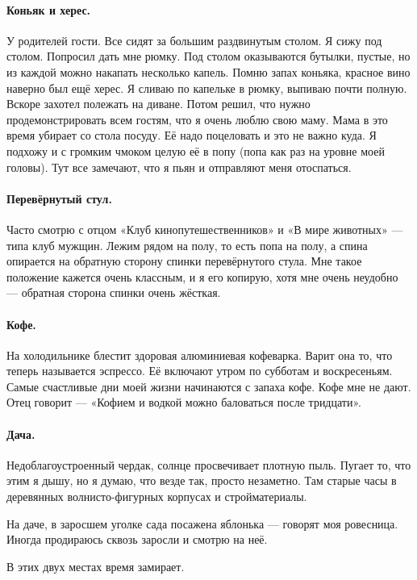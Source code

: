 \documentclass{book}
\begin{document}
\paragraph{Коньяк и херес.}
У родителей гости.
Все сидят за большим раздвинутым столом.
Я сижу под столом.
Попросил дать мне рюмку.
Под столом оказываются бутылки, пустые, но из каждой можно накапать несколько капель.
Помню запах коньяка, красное вино наверно был ещё херес.
Я сливаю по капельке в рюмку, выпиваю почти полную.
Вскоре захотел полежать на диване.
Потом решил, что нужно продемонстрировать всем гостям,
что я очень люблю свою маму. 
Мама в это время убирает со стола посуду.
Её надо поцеловать и это не важно куда.
Я подхожу и с громким чмоком целую её в попу (попа как раз на уровне моей головы).
Тут все замечают, что я пьян и отправляют меня отоспаться.

\paragraph{Перевёрнутый стул.}
Часто смотрю с отцом «Клуб кинопутешественников» и «В мире животных» --- типа клуб мужщин.
Лежим рядом на полу, то есть попа на полу, а спина опирается на обратную сторону спинки перевёрнутого стула.
Мне такое положение кажется очень классным, и я его копирую,
хотя мне очень неудобно --- обратная сторона спинки очень жёсткая.

\paragraph{Кофе.}
На холодильнике блестит здоровая алюминиевая кофеварка.
Варит она то, что теперь называется эспрессо.
Её включают утром по субботам и воскресеньям. 
Самые счастливые дни моей жизни начинаются с запаха кофе.
Кофе мне не дают.
Отец говорит --- «Кофием и водкой можно баловаться после тридцати».

\paragraph{Дача.}
Недоблагоустроенный чердак, солнце просвечивает плотную пыль.
Пугает то, что этим я дышу, но я думаю, что везде так, просто незаметно.
Там старые часы в деревянных волнисто-фигурных корпусах и стройматериалы.

На даче, в заросшем уголке сада посажена яблонька --- говорят моя ровесница.
Иногда продираюсь сквозь заросли и смотрю на неё.

В этих двух местах время замирает.
\end{document}
